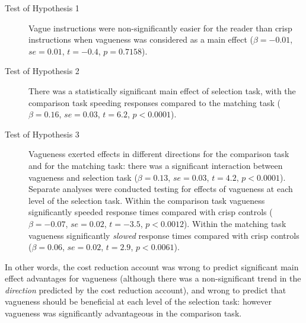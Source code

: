 \begin{description}
	\item [Test of Hypothesis 1] Vague instructions were non-significantly easier for the reader than crisp instructions when vagueness was considered as a main effect ($\beta=-0.01$, $se=0.01$, $t=-0.4$, $p=0.7158$). 
	\item [Test of Hypothesis 2] There was a statistically significant main effect of selection task, with the comparison task speeding responses compared to the matching task ($\beta=0.16$, $se=0.03$, $t=6.2$, $p<0.0001$). 
	\item [Test of Hypothesis 3] Vagueness exerted effects in different directions for the comparison task and for the matching task: there was a significant interaction between vagueness and selection task ($\beta=0.13$, $se=0.03$, $t=4.2$, $p<0.0001$). 
Separate analyses were conducted testing for effects of vagueness at each level of the selection task.
Within the comparison task vagueness significantly speeded response times compared with crisp controls ($\beta=-0.07$, $se=0.02$, $t=-3.5$, $p<0.0012$). 
Within the matching task vagueness significantly \emph{slowed} response times compared with crisp controls ($\beta=0.06$, $se=0.02$, $t=2.9$, $p<0.0061$). 
\end{description}

In other words, the cost reduction account was wrong to predict significant main effect advantages for vagueness (although there was a non-significant trend in the \emph{direction} predicted by the cost reduction account), and wrong to predict that vagueness should be beneficial at each level of the selection task: however vagueness was significantly advantageous in the comparison task.

